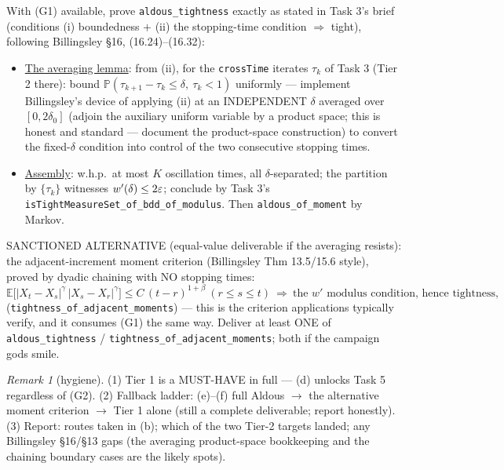 \documentclass[11pt]{article}
\theoremstyle{plain}
\theoremstyle{remark}
\newtheorem{remark}{Remark}
\newcommand{\E}{\mathbb{E}}\newcommand{\PP}{\mathbb{P}}\newcommand{\R}{\mathbb{R}}
\begin{document}
With (G1) available, prove \texttt{aldous\_tightness} exactly as stated in
Task 3's brief (conditions (i) boundedness $+$ (ii) the stopping-time
condition $\Rightarrow$ tight), following Billingsley \S16, (16.24)--(16.32):
\begin{itemize}
\item[(e)] \underline{The averaging lemma}: from (ii), for the
\texttt{crossTime} iterates $\tau_k$ of Task 3 (Tier 2 there): bound
$\PP(\tau_{k+1}-\tau_k\le\delta,\ \tau_k<1)$ uniformly --- implement
Billingsley's device of applying (ii) at an INDEPENDENT $\delta$ averaged
over $[0,2\delta_0]$ (adjoin the auxiliary uniform variable by a product
space; this is honest and standard --- document the product-space
construction) to convert the fixed-$\delta$ condition into control of the
two consecutive stopping times.
\item[(f)] \underline{Assembly}: w.h.p.\ at most $K$ oscillation times, all
$\delta$-separated; the partition by $\{\tau_k\}$ witnesses
$w'(\delta)\le2\varepsilon$; conclude by Task 3's
\texttt{isTightMeasureSet\_of\_bdd\_of\_modulus}. Then
\texttt{aldous\_of\_moment} by Markov.
\end{itemize}

SANCTIONED ALTERNATIVE (equal-value deliverable if the averaging resists):
the adjacent-increment moment criterion (Billingsley Thm 13.5/15.6 style),
proved by dyadic chaining with NO stopping times:
\[
  \E\big[|X_t-X_s|^{\gamma}\,|X_s-X_r|^{\gamma}\big]\le C\,(t-r)^{1+\beta}
  \ (r\le s\le t)\ \Longrightarrow\ \text{the }w'\text{ modulus condition, hence tightness,}
\]
(\texttt{tightness\_of\_adjacent\_moments}) --- this is the criterion
applications typically verify, and it consumes (G1) the same way. Deliver at
least ONE of \texttt{aldous\_tightness} / \texttt{tightness\_of\_adjacent\_moments};
both if the campaign gods smile.

\begin{remark}[hygiene]
(1) Tier 1 is a MUST-HAVE in full --- (d) unlocks Task 5 regardless of (G2).
(2) Fallback ladder: (e)--(f) full Aldous $\to$ the alternative
moment criterion $\to$ Tier 1 alone (still a complete deliverable; report
honestly).
(3) Report: routes taken in (b); which of the two Tier-2 targets landed;
any Billingsley \S16/\S13 gaps (the averaging product-space bookkeeping and
the chaining boundary cases are the likely spots).
\end{remark}
\end{document}
